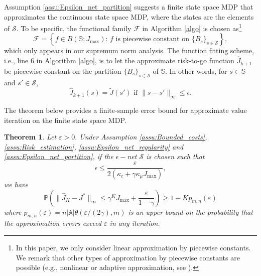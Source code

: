 \documentclass[12pt,technote,onecolumn]{IEEEtran}
\newtheorem{theorem}{Theorem}
\begin{document}
Assumption \ref{assu:Epsilon_net_partition} suggests a finite state
space MDP that approximates the continuous state space MDP, where
the states are the elements of $\mathcal{S}$. To be specific, the functional family $\mathcal{F}$ in Algorithm \ref{algo} is chosen as\footnote{In this paper, we only consider linear approximation by piecewise constants. We remark that other types of approximation by piecewise constants are possible (e.g., nonlinear or adaptive approximation, see \cite[Section 3]{devore1998nonlinear}).}
\[
\mathcal{F}=\left\{ f\in B(\mathbb{S};J_{\max}):\,f\mbox{ is piecewise constant on }\{ B_{s}\} _{s\in\mathcal{S}}\right\},
\]
which only appears in our supremum norm analysis. The function fitting scheme, i.e., line $6$ in Algorithm \ref{algo}, is to let the approximate risk-to-go function $\widehat{J}_{k+1}$ be piecewise constant on the partition $\{B_s\}_{s\in\mathcal{S}}$ of $\mathbb{S}$. In other words, for $s\in\mathbb{S}$ and $s'\in\mathcal{S}$,
$$\widehat{J}_{k+1}(s)=\widetilde{J}(s')\,\,\text{if}\,\,\|s-s'\|_{\infty}\leq\epsilon.$$

The theorem below provides a finite-sample
error bound for approximate value iteration on the finite state space
MDP.
\begin{theorem}
	\label{thm:infinite_convergence} Let $\varepsilon>0.$ Under Assumption
	\ref{assu:Bounded_costs}, \ref{assu:Risk_estimation}, \ref{assu:Epsilon_net_regularity}
	and \ref{assu:Epsilon_net_partition}, if the $\epsilon-$net $\mathcal{S}$ is chosen such that
	$$
	\epsilon\leq\frac{\varepsilon}{2\left(\kappa_{c}+\gamma\kappa_{\mu}J_{\max}\right)},
	$$
	we have	
	\[
	\mathbb{P}\left(\|\widehat{J}_{K}-J^{*}\|_{\infty}\leq\gamma^{K}J_{\max}+\frac{\varepsilon}{1-\gamma}\right)\geq1-Kp_{m,n}\left(\varepsilon\right)
	\]
	where $p_{m,n}\left(\varepsilon\right)=n\left|\mathbb{A}\right|\theta(\varepsilon/(2\gamma),m)$ is an upper bound on the probability that the approximation errors exceed $\varepsilon$ in any iteration.
\end{theorem}

\end{document}
